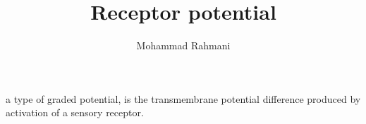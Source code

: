 \documentclass[a4paper]{article}
\title{Receptor potential}
\date{}
\author{Mohammad Rahmani}
\begin{document}
    \maketitle
    a type of graded potential, is the transmembrane potential difference produced by activation of a sensory receptor. 
    
    
\end{document}
